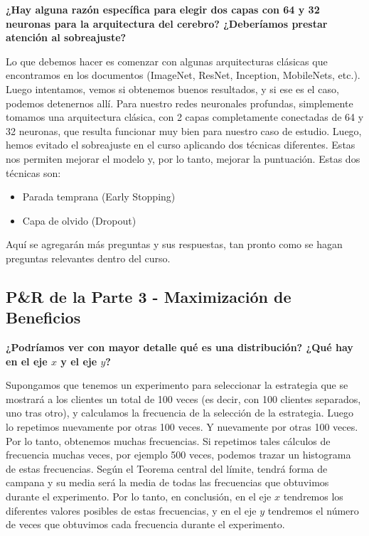 \documentclass[
]{book}
\providecommand{\tightlist}{%
  \setlength{\itemsep}{0pt}\setlength{\parskip}{0pt}}
\begin{document}
\textbf{¿Hay alguna razón específica para elegir dos capas con 64 y 32 neuronas para la arquitectura del cerebro? ¿Deberíamos prestar atención al sobreajuste?}

Lo que debemos hacer es comenzar con algunas arquitecturas clásicas que encontramos en los documentos (ImageNet, ResNet, Inception, MobileNets, etc.). Luego intentamos, vemos si obtenemos buenos resultados, y si ese es el caso, podemos detenernos allí. Para nuestro redes neuronales profundas, simplemente tomamos una arquitectura clásica, con 2 capas completamente conectadas de 64 y 32 neuronas, que resulta funcionar muy bien para nuestro caso de estudio. Luego, hemos evitado el sobreajuste en el curso aplicando dos técnicas diferentes. Estas nos permiten mejorar el modelo y, por lo tanto, mejorar la puntuación. Estas dos técnicas son:

\begin{itemize}
\tightlist
\item
  Parada temprana (Early Stopping)
\item
  Capa de olvido (Dropout)
\end{itemize}

Aquí se agregarán más preguntas y sus respuestas, tan pronto como se hagan preguntas relevantes dentro del curso.

\hypertarget{pr-de-la-parte-3---maximizaciuxf3n-de-beneficios}{%
\subsection{P\&R de la Parte 3 - Maximización de Beneficios}\label{pr-de-la-parte-3---maximizaciuxf3n-de-beneficios}}

\textbf{¿Podríamos ver con mayor detalle qué es una distribución? ¿Qué hay en el eje \(x\) y el eje \(y\)?}

Supongamos que tenemos un experimento para seleccionar la estrategia que se mostrará a los clientes un total de 100 veces (es decir, con 100 clientes separados, uno tras otro), y calculamos la frecuencia de la selección de la estrategia. Luego lo repetimos nuevamente por otras 100 veces. Y nuevamente por otras 100 veces. Por lo tanto, obtenemos muchas frecuencias. Si repetimos tales cálculos de frecuencia muchas veces, por ejemplo 500 veces, podemos trazar un histograma de estas frecuencias. Según el Teorema central del límite, tendrá forma de campana y su media será la media de todas las frecuencias que obtuvimos durante el experimento. Por lo tanto, en conclusión, en el eje \(x\) tendremos los diferentes valores posibles de estas frecuencias, y en el eje \(y\) tendremos el número de veces que obtuvimos cada frecuencia durante el experimento.
\end{document}
